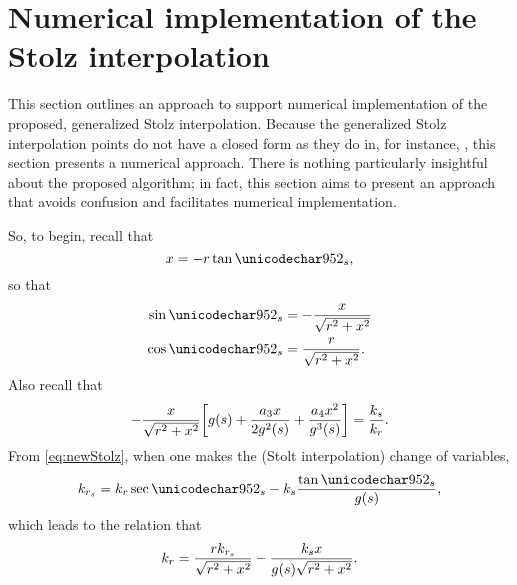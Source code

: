 \section{Numerical implementation of the Stolz interpolation}
\label{an:stolz}
This section outlines an approach to support numerical implementation of the proposed, generalized Stolz interpolation. Because the generalized Stolz interpolation points do not have a closed form as they do in, for instance, \cite{Cumming2005, Bamler1992}, this section presents a numerical approach. There is nothing particularly insightful about the proposed algorithm; in fact, this section aims to present an approach that avoids confusion and facilitates numerical implementation.
\par
So, to begin, recall that
\begin{equation}
 \xang = -\targetrange\tan\thetas,
\end{equation}
so that
\begin{align}
 \sin\thetas &= -\frac{\xang}{\sqrt{\targetrange^2+\xang^2}}\label{eq:angsin}\\
 \cos\thetas &= \frac{\targetrange}{\sqrt{\targetrange^2+\xang^2}}\label{eq:angcos}.
\end{align}
Also recall that
\begin{equation}
 -\frac{x}{\sqrt{r^2+x^2}}\biggl[g(s)+\frac{a_3x}{2g^2(s)}+\frac{a_4x^2}{g^3(s)}\biggr] = \frac{k_{s}}{k_r}.
\end{equation}
From \eqref{eq:newStolz}, when one makes the (Stolt interpolation) change of variables,
\begin{equation}
 \krstolt = \kr\sec\thetas - \kparm\frac{\tan\thetas}{\gfunc(\parm)},
\end{equation}
which leads to the relation that
\begin{equation}
 k_r = \frac{rk_{r_s}}{\sqrt{r^2+x^2}} - \frac{k_{s}x}{g(s)\sqrt{r^2+x^2}}.
\end{equation}
